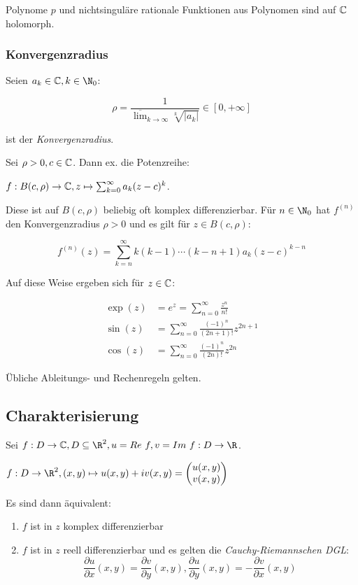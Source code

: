 Polynome $p$ und nichtsinguläre rationale Funktionen aus Polynomen sind auf $\mathbb{C}$ holomorph.

\subsubsection*{Konvergenzradius}

Seien $a_k \in \C, k \in \N_0$:

\vspace*{-2mm}
$$\rho = \frac{1}{\overline\lim_{k\to\infty} \sqrt[k]{|a_k|}} \in [0,+\infty]$$

ist der \emph{Konvergenzradius}.

Sei $\rho > 0, c \in \mathbb{C}$. Dann ex. die Potenzreihe:

$f : B(c,\rho) \to \mathbb{C}, z \mapsto \sum_{k=0}^\infty a_k(z-c)^k$.

Diese ist auf $B(c,\rho)$ beliebig oft komplex differenzierbar. Für $n \in \N_0$ hat $f^{(n)}$ den Konvergenzradius $\rho > 0$ und es gilt für $z \in B(c,\rho)$:

\vspace*{-4mm}
$$f^{(n)}(z) = \sum_{k=n}^\infty k(k-1)\cdots(k-n+1)a_k(z-c)^{k-n}$$

Auf diese Weise ergeben sich für $z \in \mathbb{C}$:

\vspace*{-4mm}
\begin{align*}
	\exp(z) &= e^z = \sum_{n=0}^\infty \frac{z^n}{n!} \\
	\sin(z) &= \sum_{n=0}^\infty \frac{(-1)^n}{(2n+1)!} z^{2n+1} \\
	\cos(z) &= \sum_{n=0}^\infty \frac{(-1)^n}{(2n)!} z^{2n}
\end{align*}

Übliche Ableitungs- und Rechenregeln gelten.

\subsection*{Charakterisierung}

Sei $f : D \to \C, D \subseteq \R^2, u = Re \ f, v = Im \ f : D \to \R$.

$f : D \to \R^2, (x,y) \mapsto u(x,y) + iv(x,y) = \begin{pmatrix} u(x,y) \\ v(x,y)\end{pmatrix}$

Es sind dann äquivalent:

\begin{enumerate}[label=(\alph*)]
	\item $f$ ist in $z$ komplex differenzierbar
	\item $f$ ist in $z$ reell differenzierbar und es gelten die \emph{Cauchy-Riemannschen DGL}: \\
		$$\frac{\partial u}{\partial x}(x,y) = \frac{\partial v}{\partial y}(x,y), \frac{\partial u}{\partial y}(x,y) = -\frac{\partial v}{\partial x}(x,y)$$
\end{enumerate}

